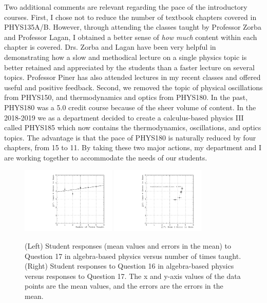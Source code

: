 \documentclass[../../main.tex]{subfiles}
\begin{document}
Two additional comments are relevant regarding the pace of the introductory courses.  First, I chose not to reduce the number of textbook chapters covered in PHYS135A/B.  However, through attending the classes taught by Professor Zorba and Professor Lagan, I obtained a better sense of \textit{how much} content within each chapter is covered.  Drs. Zorba and Lagan have been very helpful in demonstrating how a slow and methodical lecture on a single physics topic is better retained and appreciated by the students than a faster lecture on several topics.  Professor Piner has also attended lectures in my recent classes and offered useful and positive feedback.  Second, we removed the topic of physical oscillations from PHYS150, and thermodynamics and optics from PHYS180.  In the past, PHYS180 was a 5.0 credit course because of the sheer volume of content.  In the 2018-2019 we as a department decided to create a calculus-based physics III called PHYS185 which now contains the thermodynamics, oscillations, and optics topics.  The advantage is that the pace of PHYS180 is naturally reduced by four chapters, from 15 to 11.  By taking these two major actions, my department and I are working together to accommodate the needs of our students. \\ \hspace{0.1cm}

\begin{figure}[hb]
\centering
\includegraphics[width=0.4\textwidth]{Q17_algebra_based.pdf}
\includegraphics[width=0.4\textwidth]{Q16_Q17_algebra_based.pdf}
\caption{\label{fig:courses:intro_q17}  (Left) Student responses (mean values and errors in the mean) to Question 17 in algebra-based physics versus number of times taught. (Right) Student responses to Question 16 in algebra-based physics versus responses to Question 17.  The x and y-axis values of the data points are the mean values, and the errors are the errors in the mean.}
\end{figure}
\end{document}
